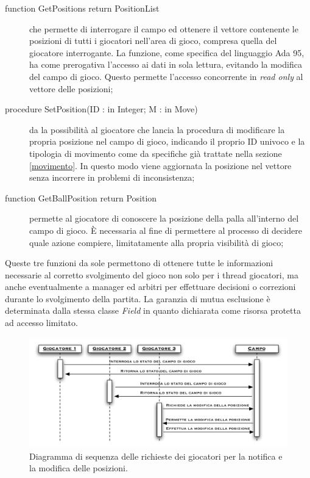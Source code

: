 \documentclass[aps,letterpaper,10pt]{article}
\begin{document}
\begin{description}
\item[function GetPositions return PositionList] che permette di interrogare il campo ed ottenere il vettore contenente
le posizioni di tutti i giocatori nell'area di gioco, compresa quella del giocatore interrogante. La funzione, come
specifica del linguaggio Ada 95, ha come prerogativa l'accesso ai dati in sola lettura, evitando la modifica del campo
di gioco. Questo permette l'accesso concorrente in \emph{read only} al vettore delle posizioni;
\item[procedure SetPosition(ID : in Integer; M : in Move)] da la possibilit\`a al giocatore che lancia la procedura di
modificare la propria posizione nel campo di gioco, indicando il proprio ID univoco e la tipologia di movimento come da
specifiche gi\`a trattate nella sezione \ref{movimento}. In questo modo viene aggiornata la posizione nel vettore senza
incorrere in problemi di inconsistenza;
\item[function GetBallPosition return Position] permette al giocatore di conoscere la posizione della palla all'interno
del campo di gioco. \`E necessaria al fine di permettere al processo di decidere quale azione compiere, limitatamente
alla propria visibilit\`a di gioco;
\end{description}

Queste tre funzioni da sole permettono di ottenere tutte le informazioni necessarie al corretto svolgimento del gioco
non solo per i thread giocatori, ma anche eventualmente a manager ed arbitri per effettuare decisioni o correzioni
durante lo svolgimento della partita. La garanzia di mutua esclusione \`e determinata dalla stessa classe \emph{Field}
in quanto dichiarata come risorsa protetta ad accesso limitato.

\begin{figure}[H]
	\begin{center}
		\includegraphics[width=440px]{images/concurrent-game-state.pdf}
	\end{center}
\caption{Diagramma di sequenza delle richieste dei giocatori per la notifica e la modifica delle posizioni.}
\end{figure}
\end{document}
